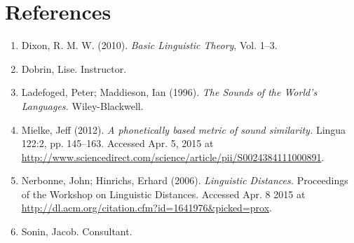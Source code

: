 \documentclass[pdftex,12pt,letterpaper]{article}
\begin{document}
 \pagebreak
 \section*{References}

 \begin{enumerate}

 \item Dixon, R. M. W. (2010). \emph{Basic Linguistic Theory}, Vol. 1--3.

 \item Dobrin, Lise. Instructor.

 \item Ladefoged, Peter; Maddieson, Ian (1996). \emph{The Sounds of the World's Languages.} Wiley-Blackwell.
 
 \item Mielke, Jeff (2012). \emph{A phonetically based metric of sound similarity.} Lingua 122:2, pp. 145--163. Accessed Apr. 5, 2015 at \url{http://www.sciencedirect.com/science/article/pii/S0024384111000891}.
 
 \item Nerbonne, John; Hinrichs, Erhard (2006). \emph{Linguistic Distances.} Proceedings of the Workshop on Linguistic Distances. Accessed Apr. 8 2015 at \url{http://dl.acm.org/citation.cfm?id=1641976&picked=prox}.

 \item Sonin, Jacob. Consultant.
 


 \end{enumerate}




 
\end{document}
